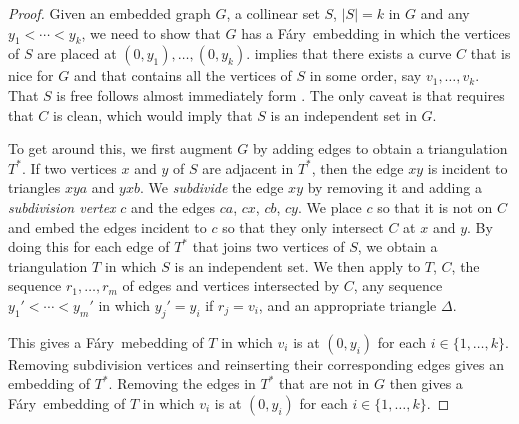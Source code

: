 \documentclass{patmorin}
\newcommand{\Fary}{Fáry}
\begin{document}
\begin{proof}
   Given an embedded graph $G$, a collinear set $S$, $|S|=k$ in $G$ and
   any $y_1<\cdots<y_k$, we need to show that $G$ has a \Fary\ embedding
   in which the vertices of $S$ are placed at $(0,y_1),\ldots,(0,y_k)$.
    implies that there exists a curve $C$ that is
   nice for $G$ and that contains all the vertices of $S$ in some order,
   say $v_1,\ldots,v_k$.  That $S$ is free follows almost immediately form
   .  The only caveat is that  requires that
   $C$ is clean, which would imply that $S$ is an independent set in $G$.

   To get around this, we first augment $G$ by adding edges to obtain a
   triangulation $T^*$. If two vertices $x$ and $y$ of $S$ are adjacent
   in $T^*$, then the edge $xy$ is incident to triangles $xya$ and
   $yxb$.  We \emph{subdivide} the edge $xy$ by removing it and adding
   a \emph{subdivision vertex} $c$ and the edges $ca$, $cx$, $cb$, $cy$.
   We place $c$ so that it is not on $C$ and embed the edges incident to
   $c$ so that they only intersect $C$ at $x$ and $y$.  By doing this
   for each edge of $T^*$ that joins two vertices of $S$, we obtain a
   triangulation $T$ in which $S$ is an independent set.  We then apply
    to $T$, $C$, the sequence $r_1,\ldots,r_m$ of edges
   and vertices intersected by $C$, any sequence $y_1'<\cdots<y_m'$
   in which $y_j'=y_i$ if $r_j=v_i$, and an appropriate triangle $\Delta$.

   This gives a \Fary\ mebedding of $T$ in which $v_i$ is at $(0,y_i)$
   for each $i\in\{1,\ldots,k\}$.  Removing subdivision vertices and
   reinserting their corresponding edges gives an embedding of $T^*$.
   Removing the edges in $T^*$ that are not in $G$ then gives a
   \Fary\ embedding of $T$ in which $v_i$ is at $(0,y_i)$ for each
   $i\in\{1,\ldots,k\}$.
\end{proof}




\end{document}
